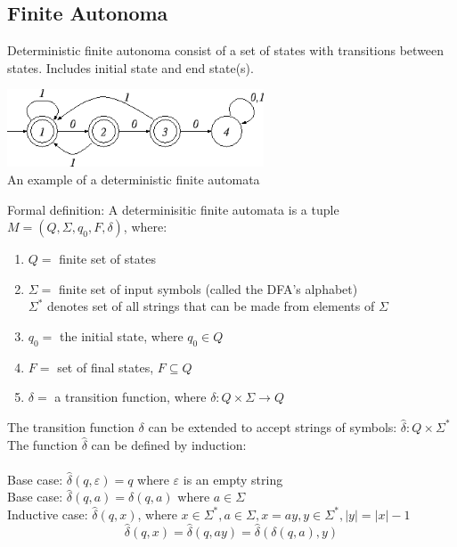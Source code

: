 \documentclass{article}
\newcommand*{\<}{\langle}
\renewcommand*{\>}{\rangle}
\begin{document}
		\subsection{Finite Autonoma}
			Deterministic finite autonoma consist of a set of states with transitions between states. Includes initial state and end state(s).
			\begin{center}
				\includegraphics[width = 3.0in]{dfaExample.png} \\
				An example of a deterministic finite automata \\
				\end{center}
			Formal definition: A determinisitic finite automata is a tuple $M = (Q, \Sigma, q_0, F, \delta)$, where: \\
			\begin{enumerate}
				\item $Q = $ finite set of states
				\item $\Sigma = $ finite set of input symbols (called the DFA's alphabet) \\
				$\Sigma^*$ denotes set of all strings that can be made from elements of $\Sigma$ 
				\item $q_0 = $ the initial state, where $q_0 \in Q$ 
				\item $F = $ set of final states, $F \subseteq Q$ 
				\item $\delta = $ a transition function, where $\delta : Q \times \Sigma \to Q$
				\end{enumerate}
			The transition function $\delta$ can be extended to accept strings of symbols: $\hat{\delta} : Q \times \Sigma^*$ \\
			The function $\hat{\delta}$ can be defined by induction: \\
			\\
			Base case: $\hat{\delta}(q, \varepsilon) = q $ where $\varepsilon$ is an empty string \\
			Base case: $\hat{\delta}(q, a) = \delta(q, a) $ where $a \in \Sigma$ \\
			Inductive case: $\hat{\delta}(q, x)$, where $x \in \Sigma^*, a \in \Sigma, x = ay, y \in \Sigma^*, |y| = |x| - 1$
			\begin{equation*}
				\hat{\delta}(q, x) = \hat{\delta}(q, ay) = \hat{\delta}(\delta(q, a), y)
				\end{equation*} 
\end{document}
